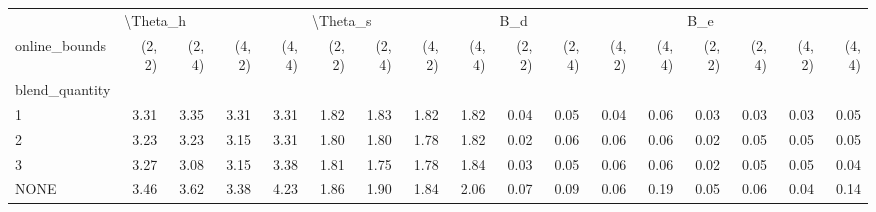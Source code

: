\begin{tabular}{lrrrrrrrrrrrrrrrr}
\toprule
{} & \multicolumn{4}{l}{\textbackslash Theta\_h} & \multicolumn{4}{l}{\textbackslash Theta\_s} & \multicolumn{4}{l}{B\_d} & \multicolumn{4}{l}{B\_e} \\
online\_bounds &   (2, 2) & (2, 4) & (4, 2) & (4, 4) &   (2, 2) & (2, 4) & (4, 2) & (4, 4) & (2, 2) & (2, 4) & (4, 2) & (4, 4) & (2, 2) & (2, 4) & (4, 2) & (4, 4) \\
blend\_quantity &          &        &        &        &          &        &        &        &        &        &        &        &        &        &        &        \\
\midrule
1              &     3.31 &   3.35 &   3.31 &   3.31 &     1.82 &   1.83 &   1.82 &   1.82 &   0.04 &   0.05 &   0.04 &   0.06 &   0.03 &   0.03 &   0.03 &   0.05 \\
2              &     3.23 &   3.23 &   3.15 &   3.31 &     1.80 &   1.80 &   1.78 &   1.82 &   0.02 &   0.06 &   0.06 &   0.06 &   0.02 &   0.05 &   0.05 &   0.05 \\
3              &     3.27 &   3.08 &   3.15 &   3.38 &     1.81 &   1.75 &   1.78 &   1.84 &   0.03 &   0.05 &   0.06 &   0.06 &   0.02 &   0.05 &   0.05 &   0.04 \\
NONE           &     3.46 &   3.62 &   3.38 &   4.23 &     1.86 &   1.90 &   1.84 &   2.06 &   0.07 &   0.09 &   0.06 &   0.19 &   0.05 &   0.06 &   0.04 &   0.14 \\
\bottomrule
\end{tabular}
